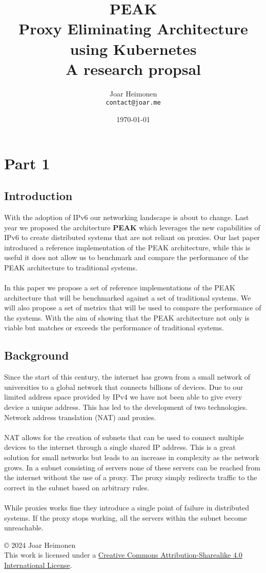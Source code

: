 \documentclass[12pt]{article}
\author{
    Joar Heimonen\\
    \texttt{contact@joar.me}
}
\title{
    \textbf{PEAK}\\[0.5em]
    \large \textbf{P}roxy \textbf{E}liminating \textbf{A}rchitecture using \textbf{K}ubernetes\\[0.3em]
    \large A research propsal
}
\date{\today}
\newcommand{\license}{
    \vspace{1em}
    \noindent\small{© 2024 Joar Heimonen\\
    This work is licensed under a \href{https://creativecommons.org/licenses/by-sa/4.0/}{Creative Commons Attribution-Sharealike 4.0 International License}.}
    \vspace{1em}
}
\begin{document}
\maketitle

\pagebreak

\tableofcontents

\pagebreak


\section{Part 1}
\subsection{Introduction}
With the adoption of IPv6 our networking landscape is about to change. Last year we proposed the architecture \textbf{PEAK} \cite{heimonenPreprintPEAKProxy} which leverages the new capabilities of IPv6
to create distributed systems that are not reliant on proxies.
Our last paper introduced a reference implementation of the PEAK architecture, while this is useful it does not allow us to benchmark and compare the performance of 
the PEAK architecture to traditional systems.
\\
\\
In this paper we propose a set of reference implementations of the PEAK architecture that will be benchmarked against a set of traditional systems.
We will also propose a set of metrics that will be used to compare the performance of the systems.
With the aim of showing that the PEAK architecture not only is viable but matches or exceeds the performance of traditional systems.

\subsection{Background}
Since the start of this century, the internet has grown from a small network of universities to a global network that connects billions of devices. Due to our limited
address space provided by IPv4 we have not been able to give every device a unique address. This has led to the development of two technologies. Network address translation (NAT) and proxies.
\\
\\
NAT allows for the creation of subnets that can be used to connect multiple devices to the internet through a single shared IP address. This is a great solution for small networks
but leads to an increase in complexity as the network grows. In a subnet consisting of servers none of these servers can be reached from the internet without the use of a proxy.
The proxy simply redirects traffic to the correct in the subnet based on arbitrary rules.
\\
\\
While proxies works fine they introduce a single point of failure in distributed systems. If the proxy stops working, all the servers within the subnet become unreachable.



\printbibliography
\license
\end{document}

